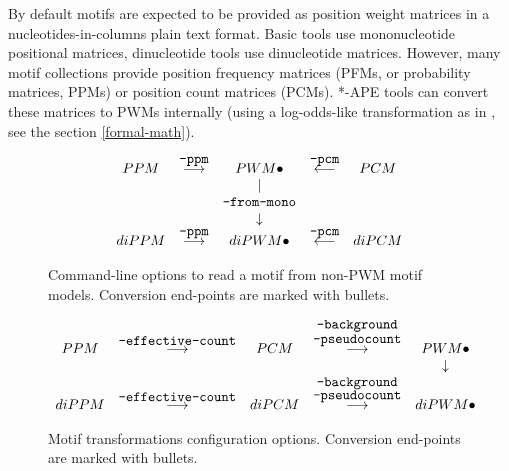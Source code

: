 By default motifs are expected to be provided as position weight matrices in a nucleotides-in-columns plain text format. Basic tools use mononucleotide positional matrices, dinucleotide tools use dinucleotide matrices. However, many motif collections provide position frequency matrices (PFMs, or probability matrices, PPMs) or position count matrices (PCMs). *-APE tools can convert these matrices to PWMs internally (using a log-odds-like transformation as in \cite{Lifanov2003}, see the section \ref{formal-math}).


\begin{figure}[h]\label{motif-conversion-types}
\centering
$$\begin{array}{ccccc}
PPM     &  \stackrel{\mbox{\texttt{--ppm}}}{\longrightarrow}  & PWM \bullet               & \stackrel{\mbox{\texttt{--pcm}}}{\longleftarrow}  &  PCM  \\
        &                                                 &          |                &                                               &  \\
        &                                                 & \mbox{\texttt{--from-mono}}   &                                               &  \\
        &                                                 &     \downarrow            &                                               &  \\
diPPM   &  \stackrel{\mbox{\texttt{--ppm}}}{\longrightarrow}  & diPWM \bullet             & \stackrel{\mbox{\texttt{--pcm}}}{\longleftarrow}  &  diPCM
\end{array}$$
\caption{Command-line options to read a motif from non-PWM motif models. Conversion end-points are marked with bullets.}
\end{figure}


\begin{figure}[h]\label{motif-conversion-configuration}
\centering
$$\begin{array}{ccccc}
PPM   & \stackrel{\mbox{\texttt{--effective-count}}}{\longrightarrow} & PCM   & \stackrel{\mbox{\texttt{--background}}}{\stackrel{\mbox{\texttt{--pseudocount}}}{\longrightarrow}} & PWM \bullet \\
      &                                                           &       &                                                                                            & \downarrow \\
diPPM & \stackrel{\mbox{\texttt{--effective-count}}}{\longrightarrow} & diPCM & \stackrel{\stackrel{\mbox{\texttt{--background}}}{\mbox{\texttt{--pseudocount}}}}{\longrightarrow} & diPWM \bullet
\end{array}$$
\caption{Motif transformations configuration options. Conversion end-points are marked with bullets.}
\end{figure}


